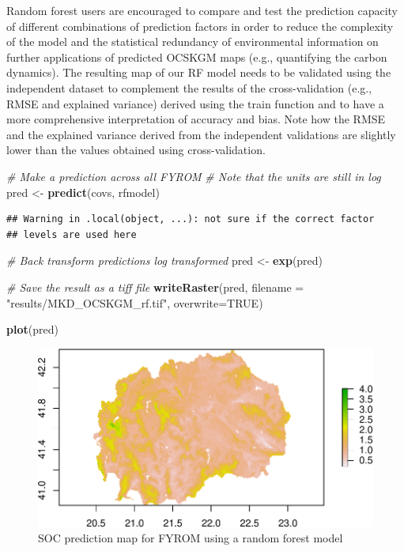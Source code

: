 \documentclass[10pt,b5paper,]{book}
\newenvironment{Shaded}{\begin{snugshade}}{\end{snugshade}}
\newcommand{\CommentTok}[1]{\textcolor[rgb]{0.56,0.35,0.01}{\textit{#1}}}
\newcommand{\DataTypeTok}[1]{\textcolor[rgb]{0.13,0.29,0.53}{#1}}
\newcommand{\KeywordTok}[1]{\textcolor[rgb]{0.13,0.29,0.53}{\textbf{#1}}}
\newcommand{\NormalTok}[1]{#1}
\newcommand{\OtherTok}[1]{\textcolor[rgb]{0.56,0.35,0.01}{#1}}
\newcommand{\StringTok}[1]{\textcolor[rgb]{0.31,0.60,0.02}{#1}}
\theoremstyle{definition}
\theoremstyle{definition}
\theoremstyle{definition}
\theoremstyle{remark}
\begin{document}
Random forest users are encouraged to compare and test the prediction
capacity of different combinations of prediction factors in order to
reduce the complexity of the model and the statistical redundancy of
environmental information on further applications of predicted OCSKGM
maps (e.g., quantifying the carbon dynamics). The resulting map of our
RF model needs to be validated using the independent dataset to
complement the results of the cross-validation (e.g., RMSE and explained
variance) derived using the train function and to have a more
comprehensive interpretation of accuracy and bias. Note how the RMSE and
the explained variance derived from the independent validations are
slightly lower than the values obtained using cross-validation.

\begin{Shaded}
\begin{Highlighting}[]
\CommentTok{# Make a prediction across all FYROM}
\CommentTok{# Note that the units are still in log}
\NormalTok{pred <-}\StringTok{ }\KeywordTok{predict}\NormalTok{(covs, rfmodel)}
\end{Highlighting}
\end{Shaded}

\begin{verbatim}
## Warning in .local(object, ...): not sure if the correct factor
## levels are used here
\end{verbatim}

\begin{Shaded}
\begin{Highlighting}[]
\CommentTok{# Back transform predictions log transformed}
\NormalTok{pred <-}\StringTok{ }\KeywordTok{exp}\NormalTok{(pred)}

\CommentTok{# Save the result as a tiff file}
\KeywordTok{writeRaster}\NormalTok{(pred, }\DataTypeTok{filename =} \StringTok{"results/MKD_OCSKGM_rf.tif"}\NormalTok{,}
            \DataTypeTok{overwrite=}\OtherTok{TRUE}\NormalTok{)}

\KeywordTok{plot}\NormalTok{(pred)}
\end{Highlighting}
\end{Shaded}

\begin{figure}
\centering
\includegraphics{SOCMapping_files/figure-latex/rf-pred-1.pdf}
\caption{\label{fig:rf-pred}SOC prediction map for FYROM using a random
forest model}
\end{figure}
\end{document}
